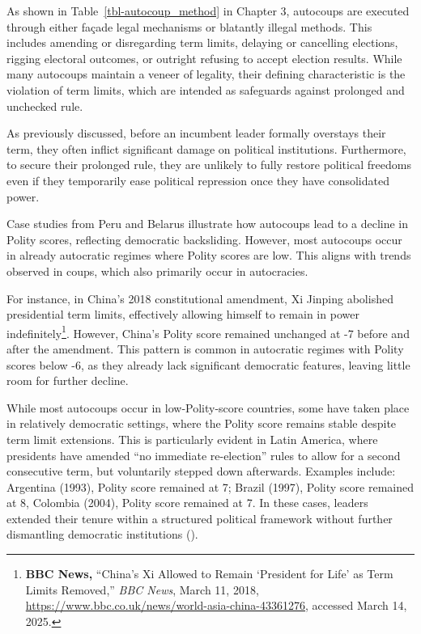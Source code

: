 \documentclass[
  12pt,
]{report}
\begin{document}
As shown in Table~\ref{tbl-autocoup_method} in Chapter 3, autocoups are
executed through either façade legal mechanisms or blatantly illegal
methods. This includes amending or disregarding term limits, delaying or
cancelling elections, rigging electoral outcomes, or outright refusing
to accept election results. While many autocoups maintain a veneer of
legality, their defining characteristic is the violation of term limits,
which are intended as safeguards against prolonged and unchecked rule.

As previously discussed, before an incumbent leader formally overstays
their term, they often inflict significant damage on political
institutions. Furthermore, to secure their prolonged rule, they are
unlikely to fully restore political freedoms even if they temporarily
ease political repression once they have consolidated power.

Case studies from Peru and Belarus illustrate how autocoups lead to a
decline in Polity scores, reflecting democratic backsliding. However,
most autocoups occur in already autocratic regimes where Polity scores
are low. This aligns with trends observed in coups, which also primarily
occur in autocracies.

For instance, in China's 2018 constitutional amendment, Xi Jinping
abolished presidential term limits, effectively allowing himself to
remain in power indefinitely\footnote{\textbf{BBC News,} ``China's Xi
  Allowed to Remain `President for Life' as Term Limits Removed,''
  \emph{BBC News}, March 11, 2018,
  \url{https://www.bbc.co.uk/news/world-asia-china-43361276}, accessed
  March 14, 2025.}. However, China's Polity score remained unchanged at
-7 before and after the amendment. This pattern is common in autocratic
regimes with Polity scores below -6, as they already lack significant
democratic features, leaving little room for further decline.

While most autocoups occur in low-Polity-score countries, some have
taken place in relatively democratic settings, where the Polity score
remains stable despite term limit extensions. This is particularly
evident in Latin America, where presidents have amended ``no immediate
re-election'' rules to allow for a second consecutive term, but
voluntarily stepped down afterwards. Examples include: Argentina (1993),
Polity score remained at 7; Brazil (1997), Polity score remained at 8,
Colombia (2004), Polity score remained at 7. In these cases, leaders
extended their tenure within a structured political framework without
further dismantling democratic institutions
().
\end{document}
